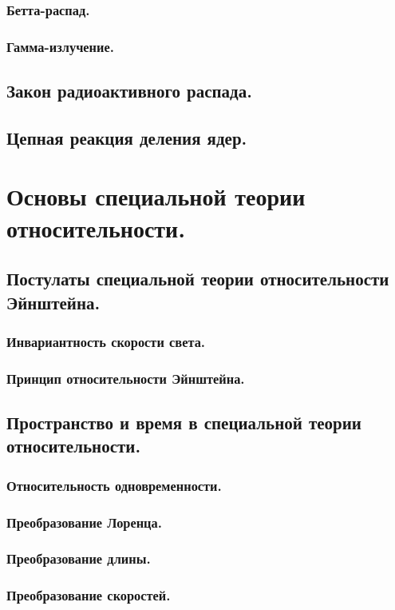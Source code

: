 \documentclass{article}
\begin{document}
        \subsubsection{Бетта-распад.}
        \subsubsection{Гамма-излучение.}
    \subsection{Закон радиоактивного распада.}
    \subsection{Цепная реакция деления ядер.}
\section{Основы специальной теории относительности.}
    \subsection{Постулаты специальной теории относительности Эйнштейна.}
        \subsubsection{Инвариантность скорости света.}
        \subsubsection{Принцип относительности Эйнштейна.}
    \subsection{Пространство и время в специальной теории относительности.}
        \subsubsection{Относительность одновременности.}
        \subsubsection{Преобразование Лоренца.}
        \subsubsection{Преобразование длины.}
        \subsubsection{Преобразование скоростей.}
\end{document}
